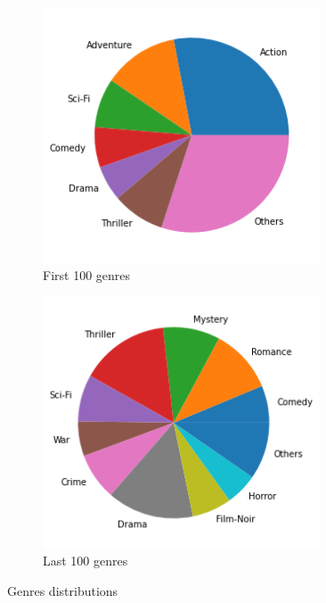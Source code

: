\documentclass{article}
\begin{document}
\begin{figure}[!ht]
    \centering
    \begin{subfigure}{0.45\textwidth}
        \includegraphics[width=0.9\textwidth]{fig/small_pie.png}
        \caption{First 100 genres}
    \end{subfigure}
    \begin{subfigure}{0.45\textwidth}
        \includegraphics[width=0.9\textwidth]{fig/large_pie.png}
        \caption{Last 100 genres}
    \end{subfigure}
    \caption{Genres distributions}
\end{figure}
\end{document}
